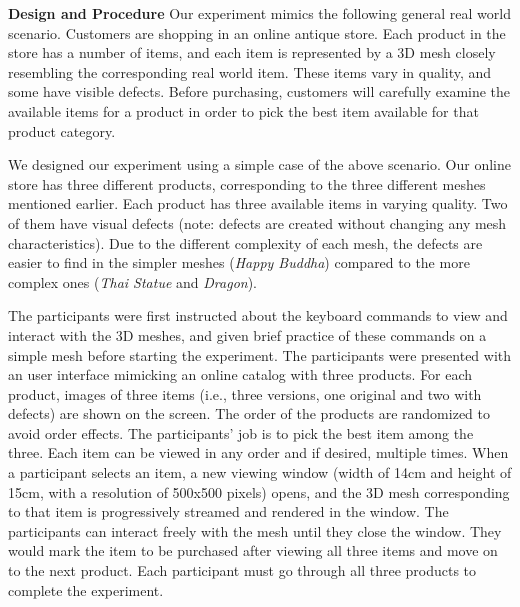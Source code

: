 \textbf{Design and Procedure}
Our experiment mimics the following general real world scenario. Customers
are shopping in an online antique store. Each product in the store has a
number of items, and each item is represented by a 3D mesh closely resembling
the corresponding real world item. These items vary in quality, and some
have visible defects. Before purchasing, customers will carefully examine the
available items for a product in order to pick the best item available for
that product category.

We designed our experiment using a simple case of the above scenario. 
Our online store has three different products,
corresponding to the three different meshes mentioned earlier. Each product
has three available items in varying quality. Two of them have visual
defects (note: defects are created without changing any mesh
characteristics). Due to the different complexity of each mesh, the defects
are easier to find in the simpler meshes (\textit{Happy Buddha}) compared to the more
complex ones (\textit{Thai Statue} and \textit{Dragon}).

The participants were first instructed about the keyboard commands 
to view and interact with the 3D meshes, and given brief practice of
these commands on a simple mesh before starting the experiment. The
participants were presented with an user interface mimicking an online
catalog with three products.  For each product, images of three items (i.e., three versions, one original and two with defects) are shown on the screen.
The order of the products are randomized to avoid order effects.
The participants' job is to pick the best item among the three. Each item 
can be viewed in any order and if desired, multiple times.  When 
a participant selects an item, a new viewing window (width of 14cm and
height of 15cm, with a resolution of 500x500 pixels) opens, and the 3D mesh corresponding to that item is
progressively streamed and rendered in the window.  
The participants can interact freely
with the mesh until they close the window.
They would mark the item to be purchased after viewing all three items and
move on to the next product. Each participant must go through all three products to
complete the experiment.

